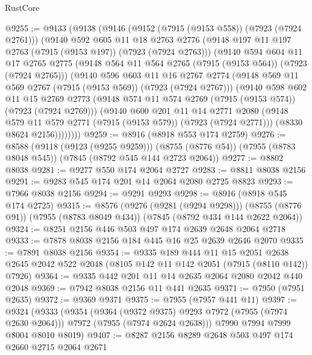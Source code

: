 \begin{lexlean}{RustCore}
\begin{coremodule}
@9255 := @9133
    (@9138
      (@9146
        (@9152 (@7915 (@9153 @558)) (@7923 (@7924 @2761)))
        (@9140
          @592
          @605
          @11
          @18
          @2763
          @2776
          (@9148 @197 @11 @197 @2763 (@7915 (@9153 @197)) (@7923 (@7924 @2763)))
          (@9140
            @594
            @604
            @11
            @17
            @2765
            @2775
            (@9148 @564 @11 @564 @2765 (@7915 (@9153 @564)) (@7923 (@7924 @2765)))
            (@9140
              @596
              @603
              @11
              @16
              @2767
              @2774
              (@9148 @569 @11 @569 @2767 (@7915 (@9153 @569)) (@7923 (@7924 @2767)))
              (@9140
                @598
                @602
                @11
                @15
                @2769
                @2773
                (@9148 @574 @11 @574 @2769 (@7915 (@9153 @574)) (@7923 (@7924 @2769)))
                (@9140
                  @600
                  @201
                  @11
                  @14
                  @2771
                  @2080
                  (@9148 @579 @11 @579 @2771 (@7915 (@9153 @579)) (@7923 (@7924 @2771)))
                  (@8330 @8624 @2156))))))))
@9259 := @8916 (@8918 @553 @174 @2759)
@9276 := @8588
    (@9118 (@9123 (@9255 @9259)))
    (@8755 (@8776 @54))
    (@7955 (@8783 @8048 @545))
    (@7845 (@8792 @545 @144 @2723 @2064))
@9277 := @8802 @8038
@9281 := @9277 @550 @174 @2064 @2727
@9283 := @8811 @8038 @2156
@9291 := @9283 @545 @174 @201 @14 @2064 @2080 @2725 @8823
@9293 := @7966 @8038 @2156
@9294 := @9291 @9293
@9298 := @8916 (@8918 @545 @174 @2725)
@9315 := @8576
    (@9276 (@9281 (@9294 @9298)))
    (@8755 (@8776 @91))
    (@7955 (@8783 @8049 @434))
    (@7845 (@8792 @434 @144 @2622 @2064))
@9324 := @8251 @2156 @446 @503 @497 @174 @2639 @2648 @2064 @2718
@9333 := @7878 @8038 @2156 @184 @445 @16 @25 @2639 @2646 @2070
@9335 := @7891 @8038 @2156
@9354 := @9335
    @189
    @444
    @11
    @15
    @2051
    @2638
    @2645
    @2042
    @522
    @2048
    (@8105 @142 @11 @142 @2051 (@7915 (@8110 @142)) @7926)
@9364 := @9335 @442 @201 @11 @14 @2635 @2064 @2080 @2042 @440 @2048
@9369 := @7942 @8038 @2156 @11 @441 @2635
@9371 := @7950 (@7951 @2635)
@9372 := @9369 @9371
@9375 := @7955 (@7957 @441 @11)
@9397 := @9324
    (@9333
      (@9354
        (@9364 (@9372 @9375) @9293 @7972 (@7955 (@7974 @2630 @2064)))
        @7972
        (@7955 (@7974 @2624 @2638)))
      @7990
      @7994
      @7999
      @8004
      @8010
      @8019)
@9407 := @8287 @2156 @8289 @2648 @503 @497 @174 @2660 @2715 @2064 @2671

\end{coremodule}
\end{lexlean}

